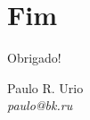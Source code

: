 \section*{Fim}

\begin{frame}
	\begin{center}
		\Huge{Obrigado!}

		\small

	\end{center}

	\small Paulo R. Urio \\
	\footnotesize{  \textsl{paulo@bk.ru} }
\end{frame}

